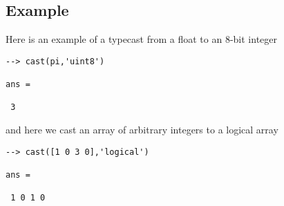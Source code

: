 \subsection{Example}

Here is an example of a typecast from a float to an 8-bit integer
\begin{verbatim}
--> cast(pi,'uint8')

ans = 

 3 
\end{verbatim}
and here we cast an array of arbitrary integers to a logical array
\begin{verbatim}
--> cast([1 0 3 0],'logical')

ans = 

 1 0 1 0 
\end{verbatim}
